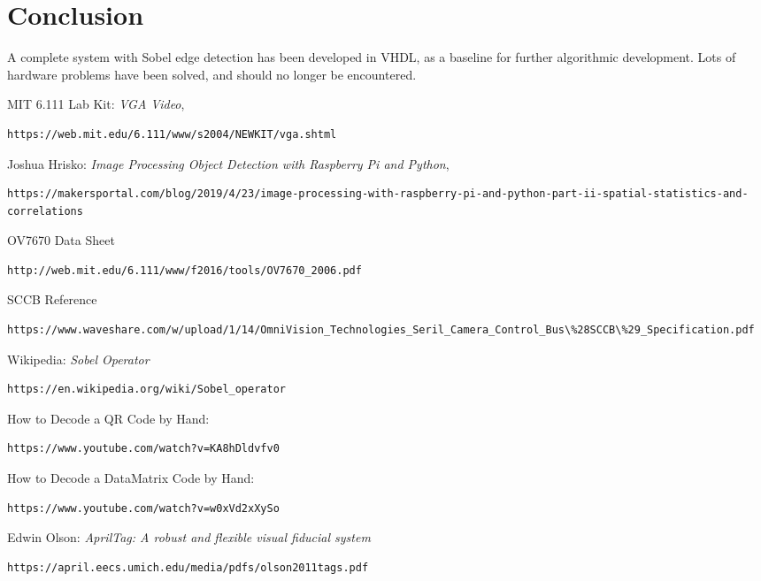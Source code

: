 \documentclass{IEEEtran}
\begin{document}
	\section{Conclusion}
	A complete system with Sobel edge detection has been developed in VHDL, as a baseline for further algorithmic development. Lots of hardware problems have been solved, and should no longer be encountered.
	\newpage
	\begin{thebibliography}{99}
            MIT 6.111 Lab Kit: \textit{VGA Video}, \begin{verbatim}https://web.mit.edu/6.111/www/s2004/NEWKIT/vga.shtml\end{verbatim}
            
            Joshua Hrisko: \textit{Image Processing Object Detection with Raspberry Pi and Python}, \begin{verbatim}https://makersportal.com/blog/2019/4/23/image-processing-with-raspberry-pi-and-python-part-ii-spatial-statistics-and-correlations\end{verbatim}            
            
	OV7670 Data Sheet \begin{verbatim}http://web.mit.edu/6.111/www/f2016/tools/OV7670_2006.pdf\end{verbatim}
	SCCB Reference\begin{verbatim}https://www.waveshare.com/w/upload/1/14/OmniVision_Technologies_Seril_Camera_Control_Bus\%28SCCB\%29_Specification.pdf\end{verbatim}
	
	Wikipedia: \textit{Sobel Operator}\begin{verbatim}https://en.wikipedia.org/wiki/Sobel_operator\end{verbatim}
    
	How to Decode a QR Code by Hand: \begin{verbatim}https://www.youtube.com/watch?v=KA8hDldvfv0\end{verbatim}
	How to Decode a DataMatrix Code by Hand: \begin{verbatim}https://www.youtube.com/watch?v=w0xVd2xXySo\end{verbatim}
	Edwin Olson: \textit{AprilTag: A robust and flexible visual fiducial system}\begin{verbatim}https://april.eecs.umich.edu/media/pdfs/olson2011tags.pdf\end{verbatim}
    

\end{thebibliography}
\end{document}
